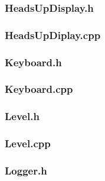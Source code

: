 \documentclass{article}
\begin{document}
	 				
\subsubsection{HeadsUpDisplay.h}
	 
	 				
\subsubsection{HeadsUpDiplay.cpp}
	 		
	 				
\subsubsection{Keyboard.h}
	 
	 				
\subsubsection{Keyboard.cpp}
	 
	 				
\subsubsection{Level.h}
	 
	 				
\subsubsection{Level.cpp}
	 
	 				
\subsubsection{Logger.h}
	 
	 				
\end{document}
